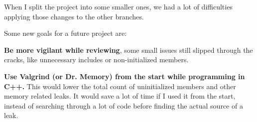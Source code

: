 When I split the project into some smaller ones, we had a lot of difficulties 
applying those changes to the other branches. 

Some new goals for a future project are:

\textbf{Be more vigilant while reviewing}, some small issues still slipped 
through the cracks, like unnecessary includes or non-initialized members.

\textbf{Use Valgrind (or Dr. Memory) from the start while programming in C++.} 
This would lower the total count of uninitialized members and other memory 
related leaks. It would save a lot of time if I used it from the start, 
instead of searching through a lot of code before finding the actual source 
of a leak.
